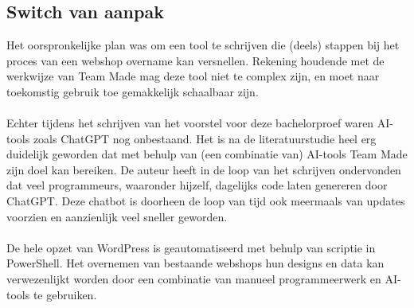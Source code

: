 
\chapter{}%
\label{ch:methodologie}

\section{Switch van aanpak}
Het oorspronkelijke plan was om een tool te schrijven die (deels) stappen bij het proces van een webshop overname kan versnellen. Rekening houdende met de werkwijze van Team Made mag deze tool niet te complex zijn, en moet naar toekomstig gebruik toe gemakkelijk schaalbaar zijn.
\\\\
Echter tijdens het schrijven van het voorstel voor deze bachelorproef waren AI-tools zoals ChatGPT nog onbestaand. Het is na de literatuurstudie heel erg duidelijk geworden dat met behulp van (een combinatie van) AI-tools Team Made zijn doel kan bereiken. De auteur heeft in de loop van het schrijven ondervonden dat veel programmeurs, waaronder hijzelf, dagelijks code laten genereren door ChatGPT. Deze chatbot is doorheen de loop van tijd ook meermaals van updates voorzien en aanzienlijk veel sneller geworden. 
\\\\
De hele opzet van WordPress is geautomatiseerd met behulp van scriptie in PowerShell. Het overnemen van bestaande webshops hun designs en data kan verwezenlijkt worden door een combinatie van manueel programmeerwerk en AI-tools te gebruiken. 
